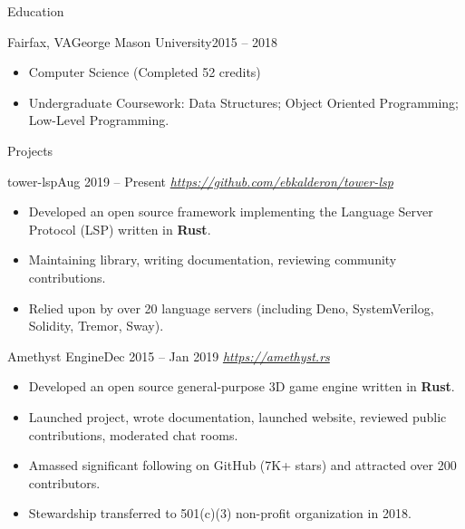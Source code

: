 \documentclass[]{mcdowellcv}
\begin{document}
	\begin{cvsection}{Education}
		\begin{cvsubsection}{Fairfax, VA}{George Mason University}{2015 -- 2018}
			\begin{itemize}
                \item Computer Science (Completed 52 credits)
                \item Undergraduate Coursework: Data Structures; Object Oriented Programming; Low-Level Programming.
			\end{itemize}
		\end{cvsubsection}
	\end{cvsection}
	
	\begin{cvsection}{Projects}
		\begin{cvsubsection}{tower-lsp}{}{Aug 2019 -- Present}
            \textit{\url{https://github.com/ebkalderon/tower-lsp}}
            \begin{itemize}
                \item Developed an open source framework implementing the Language Server Protocol (LSP) written in \textbf{Rust}.
                \item Maintaining library, writing documentation, reviewing community contributions.
                \item Relied upon by over 20 language servers (including Deno, SystemVerilog, Solidity, Tremor, Sway).
            \end{itemize}
        \end{cvsubsection}

		\begin{cvsubsection}{Amethyst Engine}{}{Dec 2015 -- Jan 2019}
            \textit{\url{https://amethyst.rs}}
			\begin{itemize}
                \item Developed an open source general-purpose 3D game engine written in \textbf{Rust}.
                \item Launched project, wrote documentation, launched website, reviewed public contributions, moderated chat rooms.
                \item Amassed significant following on GitHub (7K+ stars) and attracted over 200 contributors.
                \item Stewardship transferred to 501(c)(3) non-profit organization in 2018.
			\end{itemize}
		\end{cvsubsection}
	\end{cvsection}
	
\end{document}
